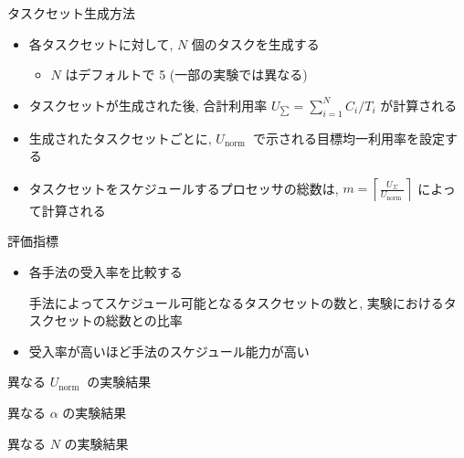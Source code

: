 \begin{frame}{タスクセット生成方法}
    \begin{itemize}
        \item 各タスクセットに対して, $N$ 個のタスクを生成する
              \begin{itemize}
                  \item $N$ はデフォルトで 5  (一部の実験では異なる)
              \end{itemize}
        \item タスクセットが生成された後, 合計利用率 $U_{\sum}=\sum_{i=1}^{N} C_{i} / T_{i}$ が計算される
        \item 生成されたタスクセットごとに, $U_{\text {norm }}$ で示される目標均一利用率を設定する
        \item タスクセットをスケジュールするプロセッサの総数は, $m=\left\lceil\frac{U_{\Sigma}}{U_{\text {norm }}}\right\rceil$ によって計算される
    \end{itemize}
\end{frame}

\begin{frame}{評価指標}
    \begin{itemize}
        \item 各手法の受入率を比較する
              \begin{definition}[受け入れ率]
                  手法によってスケジュール可能となるタスクセットの数と, 実験におけるタスクセットの総数との比率
              \end{definition}
        \item 受入率が高いほど手法のスケジュール能力が高い
    \end{itemize}
\end{frame}

\begin{frame}{異なる $U_{\text {norm }}$ の実験結果}
\end{frame}

\begin{frame}{異なる $\alpha$ の実験結果}
\end{frame}

\begin{frame}{異なる $N$ の実験結果}
\end{frame}

